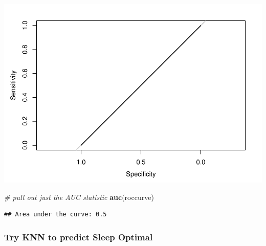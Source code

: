 \documentclass[]{article}
\newenvironment{Shaded}{\begin{snugshade}}{\end{snugshade}}
\newcommand{\KeywordTok}[1]{\textcolor[rgb]{0.13,0.29,0.53}{\textbf{{#1}}}}
\newcommand{\CommentTok}[1]{\textcolor[rgb]{0.56,0.35,0.01}{\textit{{#1}}}}
\newcommand{\NormalTok}[1]{{#1}}
\begin{document}
\includegraphics{Hmwk7AnswerKey_files/figure-latex/unnamed-chunk-18-2.pdf}

\begin{Shaded}
\begin{Highlighting}[]
\CommentTok{# pull out just the AUC statistic}
\KeywordTok{auc}\NormalTok{(roccurve)}
\end{Highlighting}
\end{Shaded}

\begin{verbatim}
## Area under the curve: 0.5
\end{verbatim}

\subsubsection{Try KNN to predict Sleep
Optimal}\label{try-knn-to-predict-sleep-optimal}
\end{document}
